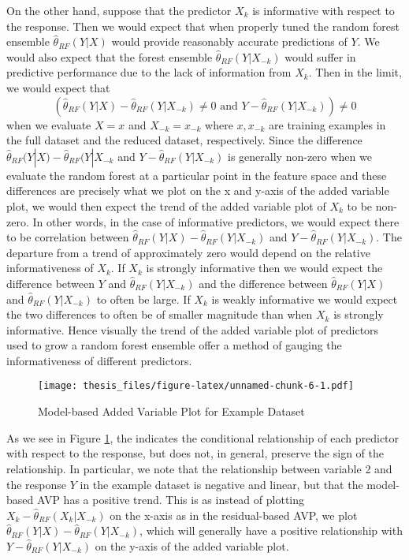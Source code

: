 \documentclass[12pt,twoside]{reedthesis}
\theoremstyle{definition}
\theoremstyle{definition}
\theoremstyle{definition}
\theoremstyle{remark}
\begin{document}
On the other hand, suppose that the predictor \(X_k\) is informative
with respect to the response. Then we would expect that when properly
tuned the random forest ensemble \(\hat{\theta}_{RF}(Y|X)\) would
provide reasonably accurate predictions of \(Y\). We would also expect
that the forest ensemble \(\hat{\theta}_{RF}(Y|X_{-k})\) would suffer in
predictive performance due to the lack of information from \(X_k\). Then
in the limit, we would expect that
\[(\hat{\theta}_{RF}(Y|X)-\hat{\theta}_{RF}(Y|X_{-k})\neq 0 \text{ and } Y-\hat{\theta}_{RF}(Y|X_{-k}))\neq 0\]
when we evaluate \(X=x\) and \(X_{-k}=x_{-k}\) where \(x,x_{-k}\) are
training examples in the full dataset and the reduced dataset,
respectively. Since the difference
\(\hat{\theta}_{RF}(Y|X)-\hat{\theta}_{RF}(Y|X_{-k}\) and
\(Y-\hat{\theta}_{RF}(Y|X_{-k})\) is generally non-zero when we evaluate
the random forest at a particular point in the feature space and these
differences are precisely what we plot on the x and y-axis of the added
variable plot, we would then expect the trend of the added variable plot
of \(X_k\) to be non-zero. In other words, in the case of informative
predictors, we would expect there to be correlation between
\(\hat{\theta}_{RF}(Y|X)-\hat{\theta}_{RF}(Y|X_{-k})\) and
\(Y-\hat{\theta}_{RF}(Y|X_{-k})\). The departure from a trend of
approximately zero would depend on the relative informativeness of
\(X_k\). If \(X_k\) is strongly informative then we would expect the
difference between \(Y\) and \(\hat{\theta}_{RF}(Y|X_{-k})\) and the
difference between \(\hat{\theta}_{RF}(Y|X)\) and
\(\hat{\theta}_{RF}(Y|X_{-k})\) to often be large. If \(X_k\) is weakly
informative we would expect the two differences to often be of smaller
magnitude than when \(X_k\) is strongly informative. Hence visually the
trend of the added variable plot of predictors used to grow a random
forest ensemble offer a method of gauging the informativeness of
different predictors. \par
\begin{figure}
\centering
\texttt{[image: thesis\_files/figure-latex/unnamed-chunk-6-1.pdf]}
\caption{\label{fig:unnamed-chunk-6}\label{AVPmodex}Model-based Added
Variable Plot for Example Dataset}
\end{figure}
As we see in Figure \ref{AVPmodex}, the indicates the conditional
relationship of each predictor with respect to the response, but does
not, in general, preserve the sign of the relationship. In particular,
we note that the relationship between variable 2 and the response \(Y\)
in the example dataset is negative and linear, but that the model-based
AVP has a positive trend. This is as instead of plotting
\(X_k-\hat{\theta}_{RF}(X_k|X_{-k})\) on the x-axis as in the
residual-based AVP, we plot
\(\hat{\theta}_{RF}(Y|X)-\hat{\theta}_{RF}(Y|X_{-k})\), which will
generally have a positive relationship with
\(Y-\hat{\theta}_{RF}(Y|X_{-k})\) on the y-axis of the added variable
plot. \par 
\end{document}
